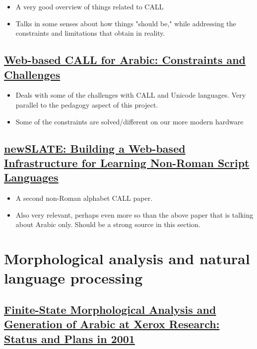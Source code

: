 \documentclass[11pt]{article}
\begin{document}
\begin{itemize}
\item A very good overview of things related to CALL
\item Talks in some senses about how things "should be," while addressing the constraints and limitations that obtain in reality.
\end{itemize}

\subsection{\href{https://www.jstor.org/stable/24149791}{Web-based CALL for Arabic: Constraints and Challenges}}
\label{sec:org6c4307d}

\begin{itemize}
\item Deals with some of the challenges with CALL and Unicode languages. Very parallel to the pedagogy aspect of this project.
\item Some of the constraints are solved/different on our more modern hardware
\end{itemize}


\subsection{\href{https://www.jstor.org/stable/24149794}{newSLATE: Building a Web-based Infrastructure for Learning Non-Roman Script Languages}}
\label{sec:org4227da5}

\begin{itemize}
\item A second non-Roman alphabet CALL paper.
\item Also very relevant, perhaps even more so than the above paper that is talking about Arabic only. Should be a strong source in this section.
\end{itemize}

\section{Morphological analysis and natural language processing}
\label{sec:orgba66de8}

\subsection{\href{http://www.europe.naverlabs.com/content/download/18525/133335/file/finite-state.pdf}{Finite-State Morphological Analysis and Generation of Arabic at Xerox Research: Status and Plans in 2001}}
\label{sec:org66825ea}
\end{document}

